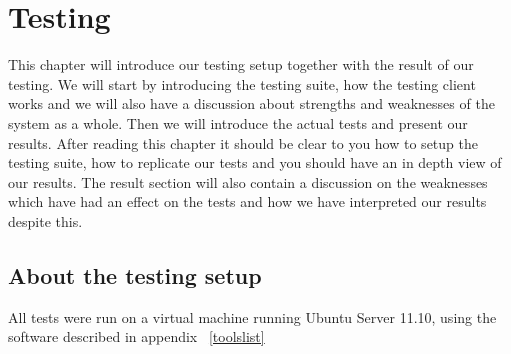\section{Testing}\label{Testing}
	This chapter will introduce our testing setup together with the result of our testing. We will start by introducing the testing suite, how the testing client works and we will also have a discussion about strengths and weaknesses of the system as a whole. Then we will introduce the actual tests and present our results. After reading this chapter it should be clear to you how to setup the testing suite, how to replicate our tests and you should have an in depth view of our results. The result section will also contain a discussion on the weaknesses which have had an effect on the tests and how we have interpreted our results despite this.
	    
    \subsection{About the testing setup}\label{Testing:About}
        All tests were run on a virtual machine running Ubuntu Server 11.10, using the software described in appendix ~\ref{toolslist}
    	
 		
    	
    	
	

    

